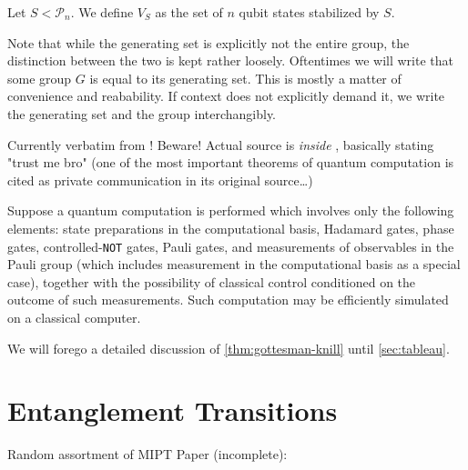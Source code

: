 \begin{defn}
  Let $S< \mathcal{P}_n$. We define $V_S$ as the set of $n$ qubit states stabilized by
  $S$.
\end{defn}

Note that while the generating set is explicitly not the entire group, the
distinction between the two is kept rather loosely. Oftentimes we will write
that some group $G$ is equal to its generating set. This is mostly a matter of
convenience and reabability. If context does not explicitly demand it, we write
the generating set and the group interchangibly.

Currently verbatim from \cite{nielsenQuantumComputationQuantum2010}! Beware!
Actual source is \emph{inside}
\cite{gottesmanHeisenbergRepresentationQuantum1998}, basically stating "trust
me bro" (one of the most important theorems of quantum computation is cited as
private communication in its original source\ldots)
\begin{thm}\label{thm:gottesman-knill}
  Suppose a quantum computation is performed which involves only the following
  elements: state preparations in the computational basis, Hadamard gates,
  phase gates, controlled-\verb|NOT| gates, Pauli gates, and measurements of
  observables in the Pauli group (which includes measurement in the
  computational basis as a special case), together with the possibility of
  classical control conditioned on the outcome of such measurements. Such
  computation may be efficiently simulated on a classical computer.
\end{thm}
We will forego a detailed discussion of \cref{thm:gottesman-knill} until
\cref{sec:tableau}. 

\section{Entanglement Transitions}\label{sec:ent-trans}

Random assortment of MIPT Paper (incomplete):

